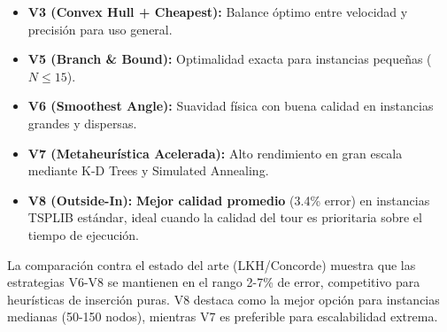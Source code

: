 \documentclass[12pt, a4paper]{article}
\begin{document}
\begin{itemize}
    \item \textbf{V3 (Convex Hull + Cheapest):} Balance óptimo entre velocidad y precisión para uso general.
    \item \textbf{V5 (Branch \& Bound):} Optimalidad exacta para instancias pequeñas ($N \leq 15$).
    \item \textbf{V6 (Smoothest Angle):} Suavidad física con buena calidad en instancias grandes y dispersas.
    \item \textbf{V7 (Metaheurística Acelerada):} Alto rendimiento en gran escala mediante K-D Trees y Simulated Annealing.
    \item \textbf{V8 (Outside-In):} \textbf{Mejor calidad promedio} (3.4\% error) en instancias TSPLIB estándar, ideal cuando la calidad del tour es prioritaria sobre el tiempo de ejecución.
\end{itemize}

La comparación contra el estado del arte (LKH/Concorde) muestra que las estrategias V6-V8 se mantienen en el rango 2-7\% de error, competitivo para heurísticas de inserción puras. V8 destaca como la mejor opción para instancias medianas (50-150 nodos), mientras V7 es preferible para escalabilidad extrema.
\end{document}
